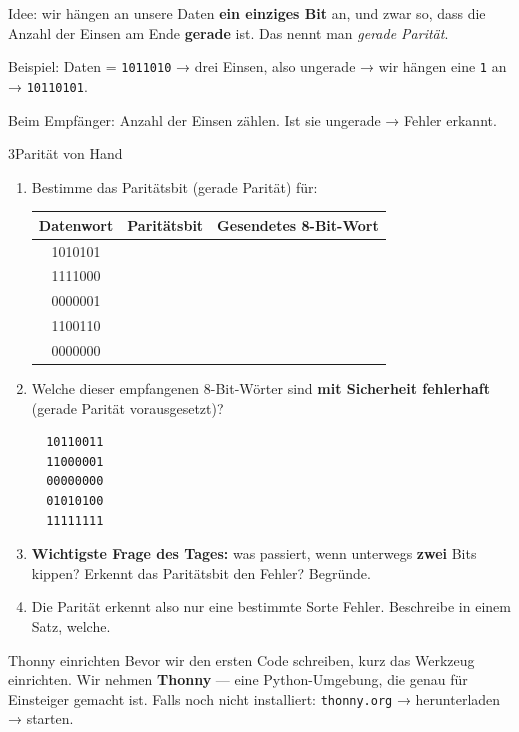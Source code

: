 Idee: wir hängen an unsere Daten \textbf{ein einziges Bit} an, und zwar
so, dass die Anzahl der Einsen am Ende \textbf{gerade} ist. Das nennt
man \emph{gerade Parität}.

Beispiel: Daten = \texttt{1011010} → drei Einsen, also ungerade → wir
hängen eine \texttt{1} an → \texttt{10110101}.

Beim Empfänger: Anzahl der Einsen zählen. Ist sie ungerade → Fehler
erkannt.

\begin{bleistiftuebung}{3}{Parität von Hand}
\begin{enumerate}[label=(\alph*), leftmargin=*]
\item Bestimme das Paritätsbit (gerade Parität) für:

  \begin{center}
  \begin{tabular}{ccc}
    \toprule
    Datenwort & Paritätsbit & Gesendetes 8-Bit-Wort \\
    \midrule
    1010101 & & \\
    1111000 & & \\
    0000001 & & \\
    1100110 & & \\
    0000000 & & \\
    \bottomrule
  \end{tabular}
  \end{center}

\item Welche dieser empfangenen 8-Bit-Wörter sind \textbf{mit
  Sicherheit fehlerhaft} (gerade Parität vorausgesetzt)?

  \begin{verbatim}
  10110011
  11000001
  00000000
  01010100
  11111111
  \end{verbatim}

\item \textbf{Wichtigste Frage des Tages:} was passiert, wenn unterwegs
  \textbf{zwei} Bits kippen? Erkennt das Paritätsbit den Fehler?
  Begründe.

\item Die Parität erkennt also nur eine bestimmte Sorte Fehler.
  Beschreibe in einem Satz, welche.
\end{enumerate}
\end{bleistiftuebung}

\begin{werkzeugcheck}{Thonny einrichten}
Bevor wir den ersten Code schreiben, kurz das Werkzeug einrichten. Wir
nehmen \textbf{Thonny} — eine Python-Umgebung, die genau für Einsteiger
gemacht ist. Falls noch nicht installiert: \texttt{thonny.org} →
herunterladen → starten.
\end{werkzeugcheck}

